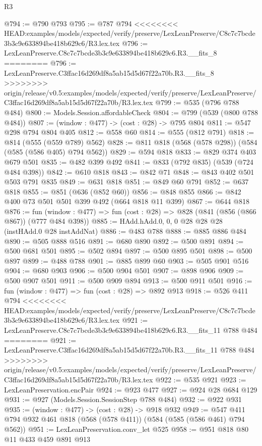 \begin{lexlean}{R3}
\begin{coremodule}
{{{{{{{{{{{{{{{{{{{{{{{{{{@794 := @790 @793
@795 := @787 @794
<<<<<<<< HEAD:examples/models/expected/verify/preserve/LexLeanPreserve/C8c7c7bcde3b3c9e633894be418b629c6/R3.lex.tex
@796 := LexLeanPreserve.C8c7c7bcde3b3c9e633894be418b629c6.R3.__fits_8
========
@796 := LexLeanPreserve.C3ffac16d269df8a5ab15d5d67f22a70b.R3.__fits_8
>>>>>>>> origin/release/v0.5:examples/models/expected/verify/preserve/LexLeanPreserve/C3ffac16d269df8a5ab15d5d67f22a70b/R3.lex.tex
@799 := @535 (@796 @788 @484)
@800 := Models.Session.affordableCheck
@804 := @799 (@539 (@800 @788 @484))
@807 := (window : @477) -> (cost : @28) -> @795 @804
@811 := @547 @298 @794 @804 @405
@812 := @558 @60
@814 := @555 (@812 @791)
@818 := @814 (@555 (@559 @789) @562)
@828 := @811 @818 (@568 (@578 @298)) (@584 (@585 (@586 @405) @794 @562))
@829 := @594 @818
@833 := @829 @374 @403 @679 @501
@835 := @482 @399 @492
@841 := @833 (@792 @835) (@539 (@724 @484 @398))
@842 := @610 @818
@843 := @842 @71
@848 := @843 @402 @501 @503 @791 @835
@849 := @631 @818
@851 := @849 @60 @791
@852 := @637 @818
@855 := @851 (@636 (@852 @60))
@856 := @848 @855
@866 := @842 @400 @73 @501 @501 @399 @492 (@664 @818 @11 @399)
@867 := @644 @818
@876 := fun (window : @477) => fun (cost : @28) => @828 (@841 (@856 (@866 @867)) (@777 @484 @398))
@885 := HAdd.hAdd.{0, 0, 0} @28 @28 @28 (instHAdd.{0} @28 instAddNat)
@886 := @483 @788
@888 := @885 @886 @484
@890 := @505 @888 @516
@891 := @680 @890
@892 := @500 @891
@894 := @500 @681 @501
@895 := @502 @894
@897 := @500 @895 @501
@898 := @500 @897
@899 := @488 @788
@901 := @885 @899 @60
@903 := @505 @901 @516
@904 := @680 @903
@906 := @500 @904 @501
@907 := @898 @906
@909 := @500 @907 @501
@911 := @500 @909 @894
@913 := @500 @911 @501
@916 := fun (window : @477) => fun (cost : @28) => @892 @913
@918 := @526 @411 @794
<<<<<<<< HEAD:examples/models/expected/verify/preserve/LexLeanPreserve/C8c7c7bcde3b3c9e633894be418b629c6/R3.lex.tex
@921 := LexLeanPreserve.C8c7c7bcde3b3c9e633894be418b629c6.R3.__fits_11 @788 @484
========
@921 := LexLeanPreserve.C3ffac16d269df8a5ab15d5d67f22a70b.R3.__fits_11 @788 @484
>>>>>>>> origin/release/v0.5:examples/models/expected/verify/preserve/LexLeanPreserve/C3ffac16d269df8a5ab15d5d67f22a70b/R3.lex.tex
@922 := @535 @921
@923 := LexLeanPreservation.encPair
@924 := @923 @477
@927 := @924 @28 @684 @129
@931 := @927 (Models.Session.SessionStep @788 @484)
@932 := @922 @931
@935 := (window : @477) -> (cost : @28) -> @918 @932
@949 := @547 @411 @794 @932 @461 @818 (@568 (@578 @411)) (@584 (@585 (@586 @461) @794 @562))
@951 := LexLeanPreservation.conv_let @525
@958 := @951 @818 @80 @11 @433 @459 @891 @913
}}}}}}}}}}}}}}}}}}}}}}}}}}
\end{coremodule}
\end{lexlean}
